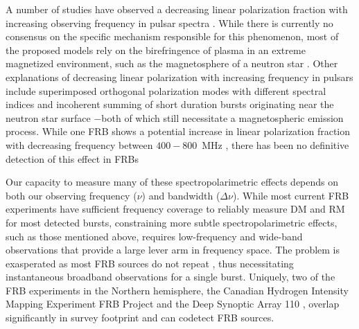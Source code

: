 \documentclass[twocolumn, linenumbers]{aastex701}
\begin{document}
A number of studies have observed a decreasing linear polarization fraction with increasing observing frequency in pulsar spectra \citep[e.g.,][]{1973ApJ...179L...7M, 1996A&A...309..481X, 1997ApJ...475..763M, 2008MNRAS.388..261J, 2015A&A...576A..62N}. While there is currently no consensus on the specific mechanism responsible for this phenomenon, most of the proposed models rely on the birefringence of plasma in an extreme magnetized environment, such as the magnetosphere of a neutron star \citep{1975ApJ...196...51R, 1986ApJ...302..138B, 1997ApJ...475..763M, 1998A&A...336..209V}. Other explanations of decreasing linear polarization with increasing frequency in pulsars include superimposed orthogonal polarization modes with different spectral indices \citep{2005MNRAS.359..481K} and incoherent summing of short duration bursts originating near the neutron star surface \citep{2008MNRAS.388..261J}$-$both of which still necessitate a magnetospheric emission process. While one FRB shows a potential increase in linear polarization fraction with decreasing frequency between $400-800$~MHz \citep{2024ApJ...968...50P}, there has been no definitive detection of this effect in FRBs

Our capacity to measure many of these spectropolarimetric effects depends on both our observing frequency ($\nu$) and bandwidth ($\Delta \nu$). While most current FRB experiments have sufficient frequency coverage to reliably measure DM and RM for most detected bursts, constraining more subtle spectropolarimetric effects, such as those mentioned above, requires low-frequency and wide-band observations that provide a large lever arm in frequency space. The problem is exasperated as most FRB sources do not repeat \citep{2023ApJ...947...83C}, thus necessitating instantaneous broadband observations for a single burst. Uniquely, two of the FRB experiments in the Northern hemisphere, the Canadian Hydrogen Intensity Mapping Experiment FRB Project \citep[CHIME/FRB, observing at $400-800$~MHz;][]{2018ApJ...863...48C} and the Deep Synoptic Array 110 \citep[DSA-110, observing at $1280-1530$~MHz;][]{2024ApJ...967...29L}, overlap significantly in survey footprint and can codetect FRB sources.
\end{document}
